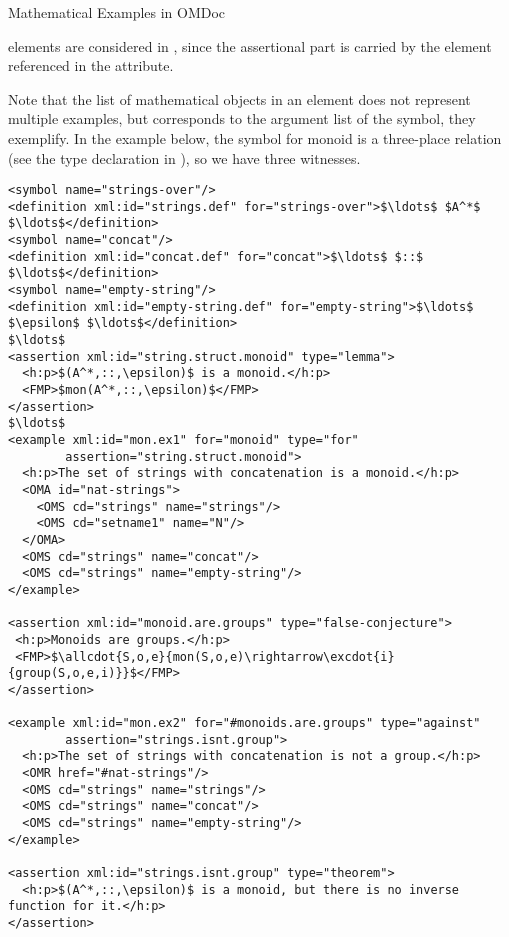 \begin{omgroup}[short=Mathematical Statements,id=statements]
\begin{omgroup}[id=examples]{Mathematical Examples in OMDoc}
\begin{module}[id=examples]
{} elements are considered
 in {\omdoc}, since the assertional part is
carried by the {} element referenced in the
{} attribute.

Note that the list of mathematical objects in an {} element does not
represent multiple examples, but corresponds to the argument list of the symbol, they
exemplify. In the example below, the symbol for monoid is a three-place relation (see the
type declaration in {}), so we have three witnesses.

\begin{lstlisting}[label=lst:example,mathescape,
  caption={An {\omdoc} representation of a mathematical example},
  index={example,for,type,assertion}]
<symbol name="strings-over"/>
<definition xml:id="strings.def" for="strings-over">$\ldots$ $A^*$ $\ldots$</definition>
<symbol name="concat"/>
<definition xml:id="concat.def" for="concat">$\ldots$ $::$ $\ldots$</definition>
<symbol name="empty-string"/>
<definition xml:id="empty-string.def" for="empty-string">$\ldots$ $\epsilon$ $\ldots$</definition>
$\ldots$
<assertion xml:id="string.struct.monoid" type="lemma">
  <h:p>$(A^*,::,\epsilon)$ is a monoid.</h:p>
  <FMP>$mon(A^*,::,\epsilon)$</FMP>
</assertion>
$\ldots$
<example xml:id="mon.ex1" for="monoid" type="for"
        assertion="string.struct.monoid">
  <h:p>The set of strings with concatenation is a monoid.</h:p>
  <OMA id="nat-strings">
    <OMS cd="strings" name="strings"/>
    <OMS cd="setname1" name="N"/>
  </OMA>
  <OMS cd="strings" name="concat"/>
  <OMS cd="strings" name="empty-string"/>
</example>

<assertion xml:id="monoid.are.groups" type="false-conjecture">
 <h:p>Monoids are groups.</h:p>
 <FMP>$\allcdot{S,o,e}{mon(S,o,e)\rightarrow\excdot{i}{group(S,o,e,i)}}$</FMP>
</assertion>

<example xml:id="mon.ex2" for="#monoids.are.groups" type="against"
        assertion="strings.isnt.group">
  <h:p>The set of strings with concatenation is not a group.</h:p>
  <OMR href="#nat-strings"/>
  <OMS cd="strings" name="strings"/>
  <OMS cd="strings" name="concat"/>
  <OMS cd="strings" name="empty-string"/>
</example>

<assertion xml:id="strings.isnt.group" type="theorem">
  <h:p>$(A^*,::,\epsilon)$ is a monoid, but there is no inverse function for it.</h:p>
</assertion>
\end{lstlisting}


\end{module}
\end{omgroup}
\end{omgroup}
